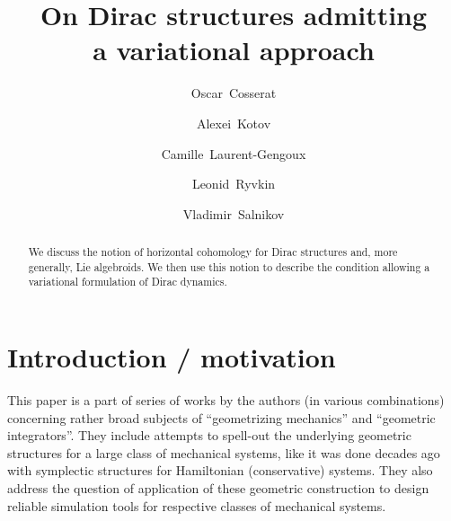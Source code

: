 \documentclass[a4paper,12pt]{amsart}
\theoremstyle{definition}
\begin{document}
\title[]{On Dirac structures admitting \\ a variational approach}





\author[O.Cosserat]{Oscar~Cosserat} 
\address{Oscar~Cosserat, LaSIE  -- CNRS \& University of La Rochelle,
Av. Michel Cr\'epeau, 17042 La Rochelle Cedex 1, France}

\author[A.Kotov]{Alexei~Kotov}
\address{Alexei~Kotov, Faculty of Science, University of Hradec Kralove, Rokitanskeho 62, Hradec Kralove 50003, Czech Republic}

\author[C.Laurent]{Camille~Laurent-Gengoux}
\address{Camille~Laurent-Gengoux, Institut Elie Cartan de Lorraine (IECL), UMR 7502 --  3 rue Augustin Fresnel, 57000 Technop\^ole Metz, France}


\author[L.Ryvkin]{Leonid~Ryvkin}
\address{Leonid~Ryvkin, Georg-August-Universität Göttingen,
Institut für Mathematik, Bunsenstr. 3-5, 37073 Göttingen // Institut Camille Jordan, Université Claude Bernard Lyon 1, 
43 boulevard du 11 novembre 1918, 69622 Villeurbanne France}

\author[V.Salnikov]{Vladimir~Salnikov} 
\address{Vladimir~Salnikov, LaSIE  -- CNRS \&  La Rochelle University,
Av. Michel Cr\'epeau, 17042 La Rochelle Cedex 1, France}



 
\begin{abstract}
We discuss the notion of  {horizontal} cohomology for Dirac structures and, more generally, Lie algebroids. We then use this notion  {to describe the condition allowing} a variational formulation of Dirac dynamics.
\keywords{
}
 

\end{abstract}


\maketitle 
\tableofcontents



\section*{Introduction / motivation}


This paper is a part of series of works by the authors (in various combinations) concerning rather broad subjects of ``geometrizing mechanics'' and ``geometric integrators''. They include attempts to spell-out the underlying geometric structures for a large class of mechanical systems, like it was done decades ago with symplectic 
structures for Hamiltonian (conservative) systems. They also address the question of application of these geometric construction to design reliable simulation tools for respective classes of mechanical systems. 
\end{document}
